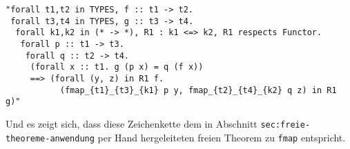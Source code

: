 \begin{verbatim}
"forall t1,t2 in TYPES, f :: t1 -> t2.
 forall t3,t4 in TYPES, g :: t3 -> t4.
  forall k1,k2 in (* -> *), R1 : k1 <=> k2, R1 respects Functor.
   forall p :: t1 -> t3.
    forall q :: t2 -> t4.
     (forall x :: t1. g (p x) = q (f x))
     ==> (forall (y, z) in R1 f.
           (fmap_{t1}_{t3}_{k1} p y, fmap_{t2}_{t4}_{k2} q z) in R1 g)"
\end{verbatim}

Und es zeigt sich, dass diese Zeichenkette dem in Abschnitt \texttt{sec:freie-theoreme-anwendung} per Hand hergeleiteten
freien Theorem zu \texttt{fmap} entspricht.
